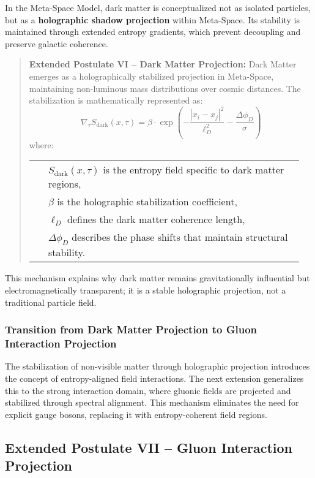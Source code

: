 \documentclass[10.5pt,a4paper]{article}
\begin{document}
In the Meta-Space Model, dark matter is conceptualized not as isolated particles, but as a \textbf{holographic 
shadow projection} within Meta-Space. Its stability is maintained through extended entropy gradients, 
which prevent decoupling and preserve galactic coherence.

\begin{quote}
\textbf{Extended Postulate VI – Dark Matter Projection:}  
Dark Matter emerges as a holographically stabilized projection in Meta-Space, maintaining non-luminous mass distributions 
over cosmic distances. The stabilization is mathematically represented as:
\[
\nabla_\tau S_{\text{dark}}(x, \tau) = \beta \cdot \exp\left(-\frac{|x_i - x_j|^2}{\ell_D^2} - \frac{\Delta \phi_D}{\sigma}\right)
\]
where:
\begin{longtable}{@{}p{0.05\linewidth}@{\quad}p{0.9\linewidth}@{}}
 & \( S_{\text{dark}}(x, \tau) \) is the entropy field specific to dark matter regions, \\
 & \( \beta \) is the holographic stabilization coefficient, \\
 & \( \ell_D \) defines the dark matter coherence length, \\
 & \( \Delta \phi_D \) describes the phase shifts that maintain structural stability. \\
\end{longtable}
\end{quote}

This mechanism explains why dark matter remains gravitationally influential but electromagnetically transparent; 
it is a stable holographic projection, not a traditional particle field.

\subsubsection*{Transition from Dark Matter Projection to Gluon Interaction Projection}

The stabilization of non-visible matter through holographic projection introduces the concept of entropy-aligned 
field interactions. The next extension generalizes this to the strong interaction domain, where gluonic fields 
are projected and stabilized through spectral alignment. This mechanism eliminates the need for explicit gauge 
bosons, replacing it with entropy-coherent field regions.

\subsection{Extended Postulate VII – Gluon Interaction Projection}
\end{document}
